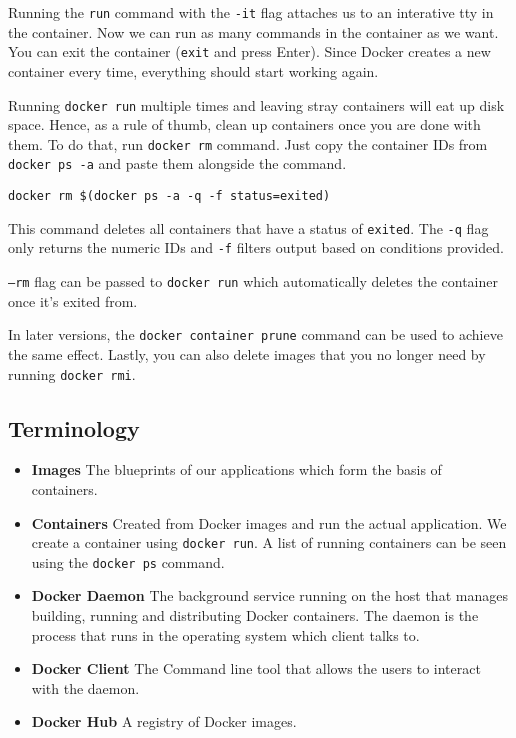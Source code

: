 \documentclass[twoside,twocolumn]{article}
\begin{document}
Running the \texttt{run} command with the \texttt{-it} flag attaches us to an interative tty in the container.
Now we can run as many commands in the container as we want.
You can exit the container (\texttt{exit} and press Enter). Since Docker creates a new container every time, everything should start working again.

Running \texttt{docker run} multiple times and leaving stray containers will eat up disk space.
Hence, as a rule of thumb, clean up containers once you are done with them.
To do that, run \texttt{docker rm} command. Just copy the container IDs from \texttt{docker ps -a} and paste them alongside the command.

\begin{verbatim}
docker rm $(docker ps -a -q -f status=exited)
\end{verbatim}

This command deletes all containers that have a status of \texttt{exited}.
The \texttt{-q} flag only returns the numeric IDs and \texttt{-f} filters output based on conditions provided.

\texttt{--rm} flag can be passed to \texttt{docker run} which automatically deletes the container once it's exited from.

In later versions, the \texttt{docker container prune} command can be used to achieve the same effect.
Lastly, you can also delete images that you no longer need by running \texttt{docker rmi}.

\subsection{Terminology}
\begin{itemize}
    \item \textbf{Images} The blueprints of our applications which form the basis of containers.
    \item \textbf{Containers} Created from Docker images and run the actual application. We create a container using \texttt{docker run}. A list of running containers can be seen using the \texttt{docker ps} command.
    \item \textbf{Docker Daemon} The background service running on the host that manages building, running and distributing Docker containers. The daemon is the process that runs in the operating system which client talks to.
    \item \textbf{Docker Client} The Command line tool that allows the users to interact with the daemon. 
    \item \textbf{Docker Hub} A registry of Docker images. 
\end{itemize}
\end{document}
